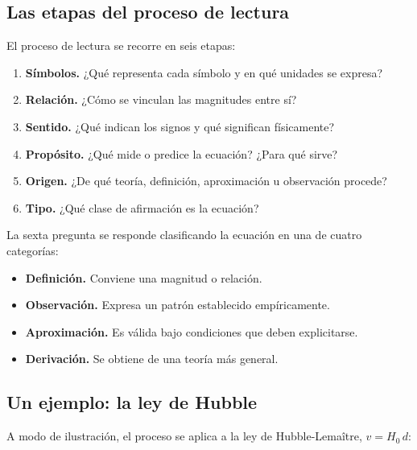 \subsection{Las etapas del proceso de lectura}

El proceso de lectura se recorre en seis etapas:

\begin{enumerate}
  \item \textbf{Símbolos.} ¿Qué representa cada símbolo y en qué unidades se expresa?
  \item \textbf{Relación.} ¿Cómo se vinculan las magnitudes entre sí?
  \item \textbf{Sentido.} ¿Qué indican los signos y qué significan físicamente?
  \item \textbf{Propósito.} ¿Qué mide o predice la ecuación? ¿Para qué sirve?
  \item \textbf{Origen.} ¿De qué teoría, definición, aproximación u observación procede?
  \item \textbf{Tipo.} ¿Qué clase de afirmación es la ecuación?
\end{enumerate}

La sexta pregunta se responde clasificando la ecuación en una de cuatro categorías:

\begin{itemize}
  \item \textbf{Definición.} Conviene una magnitud o relación.
  \item \textbf{Observación.} Expresa un patrón establecido empíricamente.
  \item \textbf{Aproximación.} Es válida bajo condiciones que deben explicitarse.
  \item \textbf{Derivación.} Se obtiene de una teoría más general.
\end{itemize}

\subsection{Un ejemplo: la ley de Hubble}

A modo de ilustración, el proceso se aplica a la ley de Hubble-Lemaître, $v = H_{0}\,d$:

